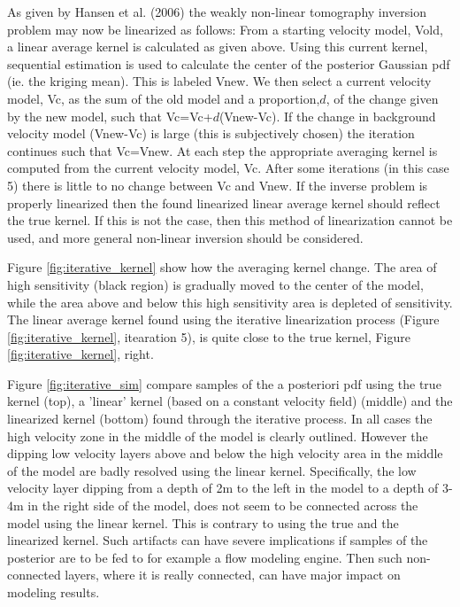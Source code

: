 \documentclass[12t]{article}
\begin{document}
As given by Hansen et al. (2006) the weakly non-linear tomography inversion problem may now be linearized as follows: 
From a starting velocity model, Vold, a linear average kernel is calculated as given above. Using this current kernel, sequential estimation is used to calculate the center of the posterior Gaussian pdf (ie. the kriging mean). This is labeled Vnew. We then select a current velocity model, Vc, as the sum of the old model and a proportion,$d$,  of the change given by the new model, such that Vc=Vc+$d$(Vnew-Vc). If the change in background velocity model (Vnew-Vc) is large (this is subjectively chosen) the iteration continues such that Vc=Vnew.
At each step the appropriate averaging kernel is computed from the current velocity model, Vc. After some iterations (in this case 5) there is little to no change between Vc and Vnew. 
If the inverse problem is properly linearized then the found linearized linear average kernel should reflect the true kernel. If this is not the case, then this method of linearization cannot be used, and more general non-linear inversion should be considered.


Figure \ref{fig:iterative_kernel} show how the averaging kernel change. The area of high sensitivity (black region) is gradually moved to the center of the model, while the area above and below this high sensitivity area is depleted of sensitivity.
The linear average kernel found using the iterative linearization process (Figure \ref{fig:iterative_kernel}, itearation 5), is quite close to the true kernel, Figure \ref{fig:iterative_kernel}, right.

Figure \ref{fig:iterative_sim} compare samples of the a posteriori pdf using the true kernel (top), a 'linear' kernel (based on a constant velocity field) (middle) and the linearized kernel (bottom) found through the iterative process. In all cases the high velocity zone in the middle of the model is clearly outlined. However the dipping low velocity layers above and below the high velocity area in the middle of the model are badly resolved using the linear kernel. Specifically, the low velocity layer dipping from a depth of 2m to the left in the model to a depth of 3-4m in the right side of the model, does not seem to be connected across the model using the linear kernel. This is contrary to using the true and the linearized kernel. 
Such artifacts can have severe implications if samples of the posterior are to be fed to for example a flow modeling engine. Then such non-connected layers, where it is really connected, can have major impact on modeling results.
\end{document}
